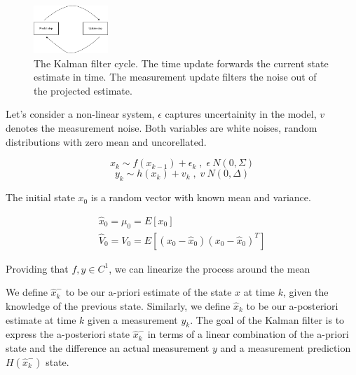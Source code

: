 \documentclass[mscthesis]{usiinfthesis}
\begin{document}

\begin{figure}[h]
    \centering
    \includegraphics[width=0.25\textwidth]{kalman_diagram.png}
    \caption{The Kalman filter cycle. The time update forwards the current state estimate in time. The measurement update filters the noise out of the projected estimate.}
    \label{fig:kalman_cycle}
\end{figure}

Let's consider a non-linear system, $\epsilon$ captures uncertainity in the model, $v$ denotes the measurement noise. Both variables are white noises, random distributions with zero mean and uncorellated. 

\[
x_k \sim f(x_{k-1}) + \epsilon_k \; , \; \epsilon ~ N(0, \Sigma)
\]
\[
y_k \sim h(x_{k}) + v_{k} \; , \; v ~ N(0, \Delta)
\]

The initial state $x_0$ is a random vector with known mean and variance.

\begin{eqfloat}
\begin{equation}
\begin{array}{l}
\hat{x}_0 = \mu_0 = E[x_0] \\
\hat{V}_0 = V_0 = E[(x_0-\hat{x}_0)(x_0-\hat{x}_0)^T] 
\end{array}
\label{eq:kalman_init}
\end{equation}
\caption{Initialization}
\end{eqfloat}

Providing that $f, y \in C^1$, we can linearize the process around the mean


We define $\hat{x}_k^-$ to be our a-priori estimate of the state $x$ at time $k$, given the knowledge of the previous state. Similarly, we define $\hat{x}_k$ to be our a-posteriori estimate at time $k$ given a measurement $y_k$. The goal of the Kalman filter is to express the a-posteriori state $\hat{x}_k^-$ in terms of a linear combination of the a-priori state and the difference an actual measurement $y$ and a measurement prediction $H(\hat{x}_k^-)$ state. 
\end{document}
